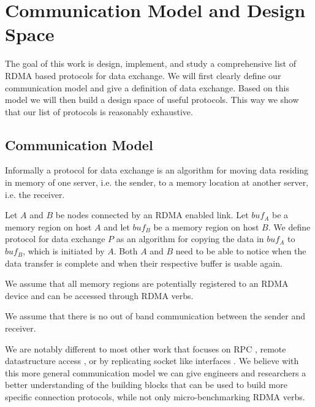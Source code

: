 \section{Communication Model and Design Space}\label{sec:model}

The goal of this work is design, implement, and study a comprehensive list of RDMA based protocols for data exchange. We will 
first clearly define our communication model and give a definition of data exchange. Based on this model we will then build 
a design space of useful protocols. This way we show that our list of protocols is reasonably exhaustive.

\subsection{Communication Model}

Informally a protocol for data exchange is an algorithm for moving data residing in memory of one server, i.e. the sender, to 
a memory location at another server, i.e. the receiver.

\begin{defn}
Let $A$ and $B$ be nodes connected by an RDMA enabled link. Let $buf_A$ be a memory region on host $A$ and let $buf_B$ 
be a memory region on host $B$. We define protocol for data exchange $P$ as an algorithm for copying the
data in $buf_A$ to $buf_B$, which is initiated by $A$. Both $A$ and $B$ need to be able to notice when the data transfer
is complete and when their respective buffer is usable again.
\end{defn}

\begin{rem}
  We assume that all memory regions are potentially registered to an RDMA device and can be accessed through RDMA verbs.
\end{rem}

\begin{rem}
  We assume that there is no out of band communication between the sender and receiver.
\end{rem}



We are notably different to most other work that focuses on RPC \cite{herd, guidlines}, remote datastructure access 
\cite{pilaf, others}, or by replicating socket like interfaces \cite{SocksDirect}. We believe with this more general
communication model we can give engineers and researchers a better understanding of the building blocks that can be 
used to build more specific connection protocols, while not only micro-benchmarking RDMA verbs.


